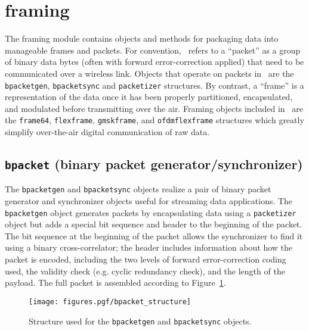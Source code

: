 % 
%

\newpage
\section{framing}
\label{module:framing}
The framing module contains objects and methods for packaging data into
manageable frames and packets.
For convention, \liquid\ refers to a ``packet'' as a group of binary
data bytes (often with forward error-correction applied)
that need to be communicated over a wireless link.
Objects that operate on packets in \liquid\ are the
{\tt bpacketgen}, {\tt bpacketsync} and {\tt packetizer} structures.
By contrast, a ``frame'' is a representation of the data once it has been
properly partitioned, encapsulated, and modulated before transmitting over the
air.
Framing objects included in \liquid\ are the
{\tt frame64}, {\tt flexframe}, {\tt gmskframe}, and
{\tt ofdmflexframe} structures
which greatly simplify over-the-air digital communication of raw data.


%
%
\subsection{{\tt bpacket} (binary packet generator/synchronizer)}
\label{module:framing:bpacket}
The {\tt bpacketgen} and {\tt bpacketsync} objects realize a pair of
binary packet generator and synchronizer objects useful for streaming
data applications.
The {\tt bpacketgen} object generates packets by encapsulating data
using a {\tt packetizer} object but adds a special bit sequence and
header to the beginning of the packet.
The bit sequence at the beginning of the packet allows the synchronizer
to find it using a binary cross-correlator;
the header includes information about how the packet is encoded,
including the two levels of forward error-correction coding used, the
validity check (e.g. cyclic redundancy check), and the length of the
payload.
The full packet is assembled according to
Figure~\ref{fig:module:framing:bpacket_structure}.
% 
%
\begin{figure}
\centering
  \texttt{[image: figures.pgf/bpacket\_structure]}
\caption{
    Structure used for the {\tt bpacketgen} and
    {\tt bpacketsync} objects.}
\label{fig:module:framing:bpacket_structure}
\end{figure}


